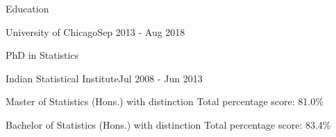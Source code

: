 \documentclass{resume} %
\begin{document}
\begin{rSection}{Education}
\begin{rSubsection}{University of Chicago}{{Sep 2013 - Aug 2018}}{}{}
\item {PhD in Statistics} 
\end{rSubsection}
\begin{rSubsection}{Indian Statistical Institute}{{Jul 2008 - Jun 2013}}{}{}
\item  {Master of Statistics (Hons.) with distinction} \hfill Total percentage score: 81.0\% 
\item  {Bachelor of Statistics (Hons.) with distinction} \hfill Total percentage score: 83.4\%
\end{rSubsection}

\end{rSection}
\end{document}
